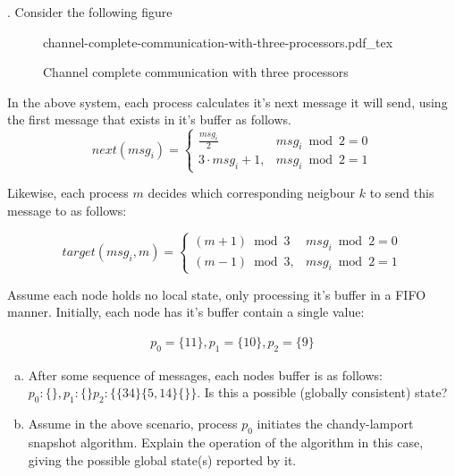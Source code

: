 \documentclass[12pt]{article}
\newcommand{\incfig}[2][1]{%
    \def\svgwidth{#1\columnwidth}
    {#2.pdf_tex}
}
\newcounter{question}
\newcommand{\question}[1]{
    \stepcounter{question}
    \thequestion. #1 \hfill
}
\begin{document}
\question{Consider the following figure}

\begin{figure}[ht]
    \centering
    \incfig{channel-complete-communication-with-three-processors}
    \caption{Channel complete communication with three processors}
    \label{fig:channel-complete-communication-with-three-processors}
\end{figure}

In the above system, each process calculates it's next message it will send, using the first message that exists in it's buffer as follows.
\[
    next(msg_{i}) = \begin{cases}
        \frac{msg_i}{2}  & msg_i \bmod 2 = 0 \\
        3 \cdot msg_i + 1, & msg_i \bmod 2 = 1
    \end{cases}
\]

Likewise, each process $m$ decides which corresponding neigbour $k$ to send this message to as follows:

\[
    target(msg_i, m) = \begin{cases}
        (m + 1) \bmod 3  & msg_i \bmod 2 = 0 \\
        (m - 1) \bmod 3, & msg_i \bmod 2 = 1
    \end{cases}
\]

Assume each node holds no local state, only processing it's buffer in a FIFO manner. Initially, each node has it's buffer contain a single value:

\begin{align*}
    p_0 = \{11\},
    p_1 = \{10\},
    p_2 = \{9\}
\end{align*}

\begin{enumerate}[(a)]
    \item After some sequence of messages, each nodes buffer is as follows: $p_0: \{\},  p_1: \{\}  p_2: \{\{34\}\{5,14\}\{\}\}$. Is this a possible (globally consistent) state?
    \item Assume in the above scenario, process $p_0$ initiates the chandy-lamport snapshot algorithm. Explain the operation of the algorithm in this case, giving the possible global state(s) reported by it.
\end{enumerate}
\end{document}
